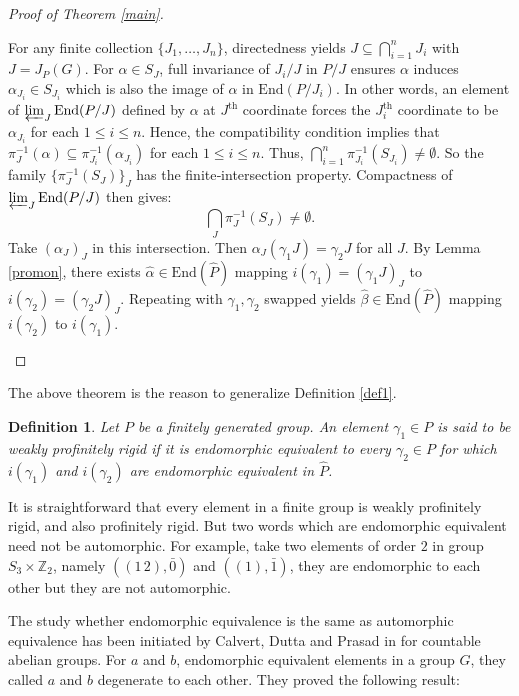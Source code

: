 \documentclass[12pt]{amsart}
\def \Z {{\mathbb{Z}}}
\newtheorem{definition}[theorem]{Definition}
\begin{document}
\begin{proof}[Proof of Theorem \ref{main}]
\begin{description}
For any finite collection $\{J_1, \dots, J_n\}$, directedness yields $J \subseteq \bigcap_{i=1}^n J_i$ with $J = J_P(G)$. For $\alpha \in S_J$, full invariance of $J_i/J$ in $P/J$ ensures $\alpha$ induces $\alpha_{J_i} \in S_{J_i}$ which is also the image of $\alpha$ in $\mathrm{End}(P/J_i)$. In other words, an element of $\varprojlim_{J} \mathrm{End}(P/J)$ defined by $\alpha$ at $J^{\text{th}}$ coordinate forces the $J_i^{\text{th}}$ coordinate to be $\alpha_{J_i}$ for each $1 \leq i \leq n$. Hence, the compatibility condition implies that $\pi_{J}^{-1}(\alpha) \subseteq \pi_{J_i}^{-1}(\alpha_{J_i})$ for each $1 \leq i \leq n$. Thus, $\bigcap_{i=1}^n \pi_{J_i}^{-1}(S_{J_i}) \neq \emptyset$. So the family $\{\pi_J^{-1}(S_J)\}_J$ has the finite‐intersection property. Compactness of $\varprojlim_{J} \mathrm{End}(P/J)$ then gives:
$$
\bigcap_J \pi_J^{-1}(S_J) \neq \emptyset.
$$
Take $(\alpha_J)_J$ in this intersection. Then $\alpha_J(\gamma_1 J) = \gamma_2 J$ for all $J$. By Lemma \ref{promon}, there exists $\widehat{\alpha} \in \mathrm{End}(\widehat{P})$ mapping $i(\gamma_1) = (\gamma_1 J)_J$ to $i(\gamma_2) = (\gamma_2 J)_J$. Repeating with $\gamma_1,\gamma_2$ swapped yields $\widehat{\beta} \in \mathrm{End}(\widehat{P})$ mapping $i(\gamma_2)$ to $i(\gamma_1)$.
\end{description} 
\end{proof}

The above theorem is the reason to generalize Definition \ref{def1}.

\begin{definition}
    Let $P$ be a finitely generated group. An element $\gamma_1 \in P$ is said to be weakly profinitely rigid if it is endomorphic equivalent to every $\gamma_2\in P$ for which $i(\gamma_1)$ and $i(\gamma_2)$ are endomorphic equivalent in $\widehat{P}$.
\end{definition}

 
 It is straightforward that every element in a finite group is weakly profinitely rigid, and also profinitely rigid. But two words which are endomorphic equivalent need not be automorphic. For example, take two elements of order $2$ in group $S_3 \times \Z_2$, namely $((1\,2),\bar{0})$ and $((1 ),\bar{1})$, they are endomorphic to each other but they are not automorphic. 
 
 The study whether endomorphic equivalence is the same as automorphic equivalence has been initiated by Calvert, Dutta and Prasad in \cite{calvert2013degeneration} for countable abelian groups. For $a$ and $b$, endomorphic equivalent elements in a group $G$, they called $a$ and $b$ degenerate to each other. They proved the following result:
\end{document}
